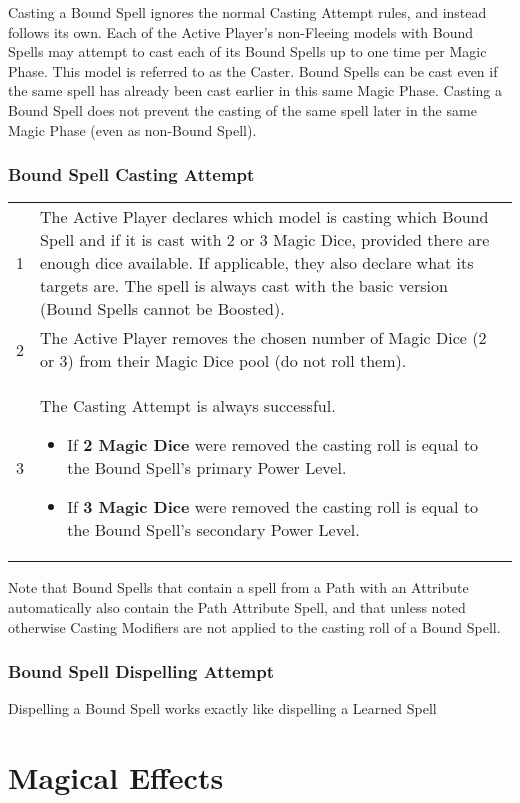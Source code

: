 Casting a Bound Spell ignores the normal Casting Attempt rules, and instead follows its own. Each of the Active Player's non-Fleeing models with Bound Spells may attempt to cast each of its Bound Spells up to one time per Magic Phase. This model is referred to as the Caster. Bound Spells can be cast even if the same spell has already been cast earlier in this same Magic Phase. Casting a Bound Spell does not prevent the casting of the same spell later in the same Magic Phase (even as non-Bound Spell).

\subsubsection{Bound Spell Casting Attempt}

\hspace*{0.3cm}
\begin{tabular}{c|m{14cm}}
1 & The Active Player declares which model is casting which Bound Spell and if it is cast with 2 or 3 Magic Dice, provided there are enough dice available. If applicable, they also declare what its targets are. The spell is always cast with the basic version (Bound Spells cannot be Boosted).  \tabularnewline
2 & The Active Player removes the chosen number of Magic Dice (2 or 3) from their Magic Dice pool (do not roll them). \tabularnewline
3 & The Casting Attempt is always successful.
\begin{itemize}[label={-}]
\item If \textbf{2 Magic Dice} were removed the casting roll is equal to the Bound Spell's primary Power Level.
\item If \textbf{3 Magic Dice} were removed the casting roll is equal to the Bound Spell's secondary Power Level.
\end{itemize} \tabularnewline
\end{tabular}

Note that Bound Spells that contain a spell from a Path with an Attribute automatically also contain the Path Attribute Spell, and that unless noted otherwise Casting Modifiers are not applied to the casting roll of a Bound Spell.

\subsubsection{Bound Spell Dispelling Attempt}

Dispelling a Bound Spell works exactly like dispelling a Learned Spell

\section{Magical Effects}

